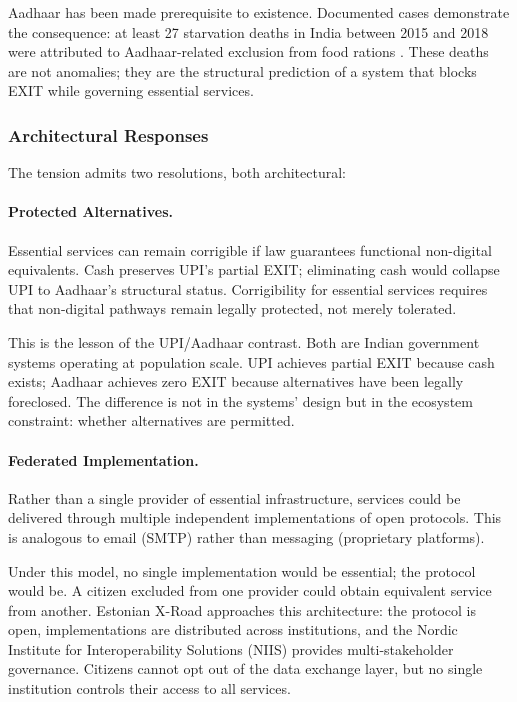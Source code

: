 \documentclass{article}
\begin{document}
Aadhaar has been made prerequisite to existence. Documented cases demonstrate the consequence: at least 27 starvation deaths in India between 2015 and 2018 were attributed to Aadhaar-related exclusion from food rations \citep{khera2017}. These deaths are not anomalies; they are the structural prediction of a system that blocks EXIT while governing essential services.

\subsubsection{Architectural Responses}

The tension admits two resolutions, both architectural:

\paragraph{Protected Alternatives.} Essential services can remain corrigible if law guarantees functional non-digital equivalents. Cash preserves UPI's partial EXIT; eliminating cash would collapse UPI to Aadhaar's structural status. Corrigibility for essential services requires that non-digital pathways remain legally protected, not merely tolerated.

This is the lesson of the UPI/Aadhaar contrast. Both are Indian government systems operating at population scale. UPI achieves partial EXIT because cash exists; Aadhaar achieves zero EXIT because alternatives have been legally foreclosed. The difference is not in the systems' design but in the ecosystem constraint: whether alternatives are permitted.

\paragraph{Federated Implementation.} Rather than a single provider of essential infrastructure, services could be delivered through multiple independent implementations of open protocols. This is analogous to email (SMTP) rather than messaging (proprietary platforms).

Under this model, no single implementation would be essential; the protocol would be. A citizen excluded from one provider could obtain equivalent service from another. Estonian X-Road approaches this architecture: the protocol is open, implementations are distributed across institutions, and the Nordic Institute for Interoperability Solutions (NIIS) provides multi-stakeholder governance. Citizens cannot opt out of the data exchange layer, but no single institution controls their access to all services.
\end{document}

